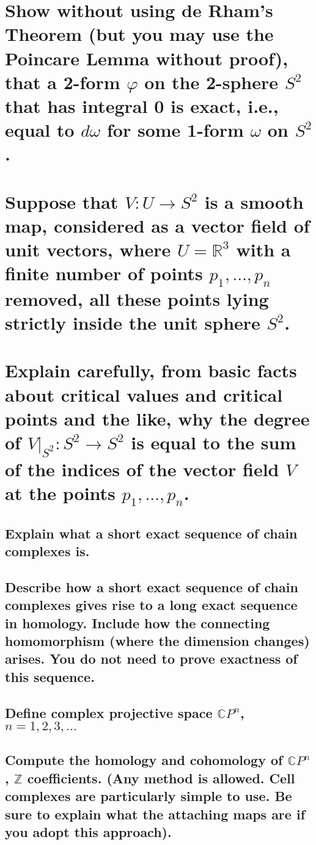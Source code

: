 \documentclass[10pt]{article}
\begin{document}
\section{Show without using de Rham's Theorem (but you may use the Poincare Lemma without proof),
  that a 2-form $\varphi$ on the 2-sphere $S^2$ that has integral 0 is exact, i.e., equal to $d
  \omega$ for some 1-form $\omega$ on $S^2$.}

\section{Suppose that $V: U \to S^2$ is a smooth map, considered as a vector field of unit vectors,
  where $U = \mathbb{R}^3 $ with a finite number of points $p_1, \dots, p_n$ removed, all these
  points lying strictly inside the unit sphere $S^2$. \\\\ Explain carefully, from basic facts about
  critical values and critical points and the like, why the degree of $V|_{S^2} : S^2 \to S^2$ is
  equal to the sum of the indices of the vector field $V$ at the points $p_1, \dots, p_n$.}

\advsection{}

\subsection{Explain what a short exact sequence of chain complexes is.}

\subsection{Describe how a short exact sequence of chain complexes gives rise to a long exact
  sequence in homology. Include how the connecting homomorphism (where the dimension changes)
  arises. You do not need to prove exactness of this sequence.}

\advsection{}

\subsection{Define complex projective space $\mathbb{C} P^n$, $n = 1,2,3, \dots$}

\subsection{Compute the homology and cohomology of $\mathbb{C} P^n$, $\mathbb{Z}$ coefficients. (Any
  method is allowed. Cell complexes are particularly simple to use. Be sure to explain what the
  attaching maps are if you adopt this approach).}
\end{document}
